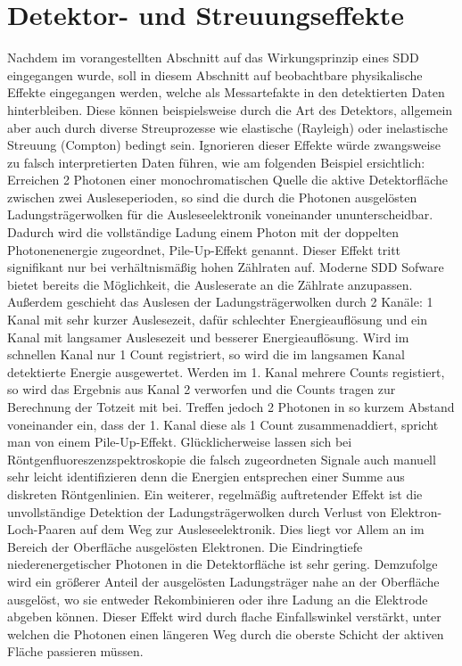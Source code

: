 \section{Detektor- und Streuungseffekte}
Nachdem im vorangestellten Abschnitt auf das Wirkungsprinzip eines SDD eingegangen wurde, soll in diesem Abschnitt auf beobachtbare physikalische Effekte eingegangen werden, welche als Messartefakte in den detektierten Daten hinterbleiben. Diese können beispielsweise durch die Art des Detektors, allgemein aber auch durch diverse Streuprozesse wie elastische (Rayleigh) oder inelastische Streuung (Compton) bedingt sein. Ignorieren dieser Effekte würde zwangsweise zu falsch interpretierten Daten führen, wie am folgenden Beispiel ersichtlich:\newlines
Erreichen 2 Photonen einer monochromatischen Quelle die aktive Detektorfläche zwischen zwei Ausleseperioden, so sind die durch die Photonen ausgelösten Ladungsträger\-wolken für die Ausleseelektronik voneinander ununterscheidbar. Dadurch wird die voll\-ständige Ladung einem Photon mit der doppelten Photonenenergie zugeordnet, Pile-Up-Effekt genannt. Dieser Effekt tritt signifikant nur bei verhältnismäßig hohen Zählraten auf. Moderne SDD Sofware bietet bereits die Möglichkeit, die Ausleserate an die Zählrate anzupassen. Außerdem geschieht das Auslesen der Ladungsträgerwolken durch 2 Kanäle: 1 Kanal mit sehr kurzer Auslesezeit, dafür schlechter Energieauflösung und ein Kanal mit langsamer Auslesezeit und besserer Energieauflösung. Wird im schnellen Kanal nur 1 Count registriert, so wird die im langsamen Kanal detektierte Energie ausgewertet. Werden im 1. Kanal mehrere Counts registiert, so wird das Ergebnis aus Kanal 2 verworfen und die Counts tragen zur Berechnung der Totzeit mit bei. Treffen jedoch 2 Photonen in so kurzem Abstand voneinander ein, dass der 1. Kanal diese als 1 Count zusammenaddiert, spricht man von einem Pile-Up-Effekt. Glücklicherweise lassen sich bei Röntgenfluoreszenzspektroskopie die falsch zugeordneten Signale auch manuell sehr leicht identifizieren denn die Energien entsprechen einer Summe aus diskreten Röntgenlinien.\newlines
Ein weiterer, regelmäßig auftretender Effekt ist die unvollständige Detektion der Ladungsträgerwolken durch Verlust von Elektron-Loch-Paaren auf dem Weg zur Ausleseelektronik. Dies liegt vor Allem an im Bereich der Oberfläche ausgelösten Elektronen. Die Eindringtiefe niederenergetischer Photonen in die Detektorfläche ist sehr gering. Demzufolge wird ein größerer Anteil der ausgelösten Ladungsträger nahe an der Oberfläche ausgelöst, wo sie entweder Rekombinieren oder ihre Ladung an die Elektrode abgeben können. Dieser Effekt wird durch flache Einfallswinkel verstärkt, unter welchen die Photonen einen längeren Weg durch die oberste Schicht der aktiven Fläche passieren müssen.\newlines
